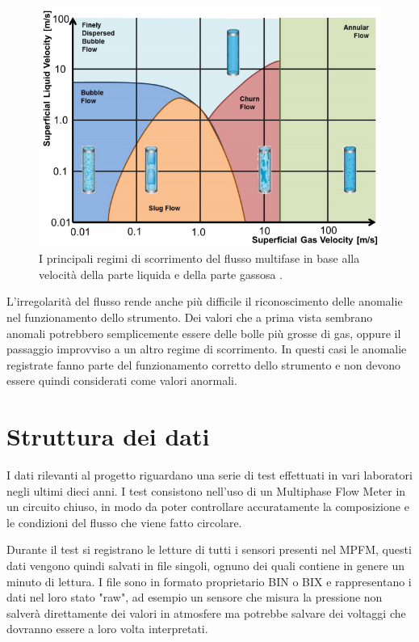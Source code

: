 \begin{figure}
	\includegraphics[width=\textwidth]{figures/flowtypes}
	\caption[Tipologie di flusso multifase]{
		I principali regimi di scorrimento del flusso multifase in base alla velocità della parte liquida e della parte gassosa \cite{multiphaseIntroduction}.
		\label{fig:flowtypes}}
\end{figure}

L'irregolarità del flusso rende anche più difficile il riconoscimento delle anomalie nel funzionamento dello strumento. Dei valori che a prima vista sembrano anomali potrebbero semplicemente essere delle bolle più grosse di gas, oppure il passaggio improvviso a un altro regime di scorrimento. In questi casi le anomalie registrate fanno parte del funzionamento corretto dello strumento e non devono essere quindi considerati come valori anormali.

\section{Struttura dei dati} \label{"StrutturaDeiDati"}
I dati rilevanti al progetto riguardano una serie di test effettuati in vari laboratori negli ultimi dieci anni. I test consistono nell'uso di un Multiphase Flow Meter in un circuito chiuso, in modo da poter controllare accuratamente la composizione e le condizioni del flusso che viene fatto circolare. 

Durante il test si registrano le letture di tutti i sensori presenti nel MPFM, questi dati vengono quindi salvati in file singoli, ognuno dei quali contiene in genere un minuto di lettura. I file sono in formato proprietario BIN o BIX e rappresentano i dati nel loro stato "raw", ad esempio un sensore che misura la pressione non salverà direttamente dei valori in atmosfere ma potrebbe salvare dei voltaggi che dovranno essere a loro volta interpretati.

